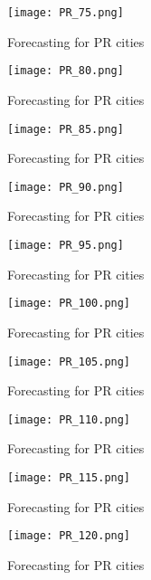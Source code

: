  \begin{figure}[!ht] 
 \centering 
 \texttt{[image: PR\_75.png]} 
 \caption{Forecasting for PR cities } 
 \label{fig:PR_75} 
 \end{figure} 
 
 \begin{figure}[!ht] 
 \centering 
 \texttt{[image: PR\_80.png]} 
 \caption{Forecasting for PR cities } 
 \label{fig:PR_80} 
 \end{figure} 
 
 \begin{figure}[!ht] 
 \centering 
 \texttt{[image: PR\_85.png]} 
 \caption{Forecasting for PR cities } 
 \label{fig:PR_85} 
 \end{figure} 
 
 \begin{figure}[!ht] 
 \centering 
 \texttt{[image: PR\_90.png]} 
 \caption{Forecasting for PR cities } 
 \label{fig:PR_90} 
 \end{figure} 
 
 \begin{figure}[!ht] 
 \centering 
 \texttt{[image: PR\_95.png]} 
 \caption{Forecasting for PR cities } 
 \label{fig:PR_95} 
 \end{figure} 
 
 \begin{figure}[!ht] 
 \centering 
 \texttt{[image: PR\_100.png]} 
 \caption{Forecasting for PR cities } 
 \label{fig:PR_100} 
 \end{figure} 
 
 \begin{figure}[!ht] 
 \centering 
 \texttt{[image: PR\_105.png]} 
 \caption{Forecasting for PR cities } 
 \label{fig:PR_105} 
 \end{figure} 
 
 \begin{figure}[!ht] 
 \centering 
 \texttt{[image: PR\_110.png]} 
 \caption{Forecasting for PR cities } 
 \label{fig:PR_110} 
 \end{figure} 
 
 \begin{figure}[!ht] 
 \centering 
 \texttt{[image: PR\_115.png]} 
 \caption{Forecasting for PR cities } 
 \label{fig:PR_115} 
 \end{figure} 
 
 \begin{figure}[!ht] 
 \centering 
 \texttt{[image: PR\_120.png]} 
 \caption{Forecasting for PR cities } 
 \label{fig:PR_120} 
 \end{figure} 
 
